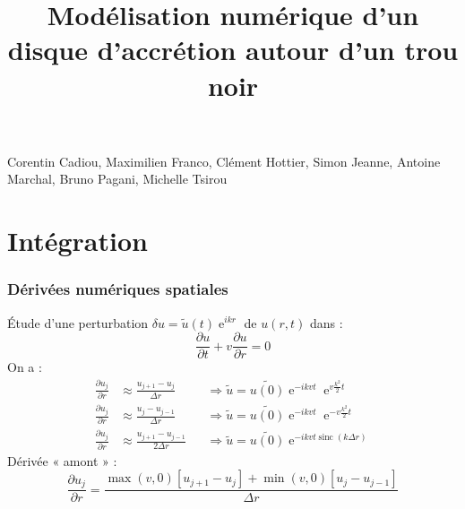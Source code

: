 \documentclass[french]{beamer}
\title{Modélisation numérique d'un disque d'accrétion autour d'un trou noir}
\date{}
\DeclareMathOperator{\sinc}{sinc}
\DeclareMathOperator{\e}{e}
\begin{document}
\begin{frame}
\maketitle
\begin{center}
Corentin Cadiou, Maximilien Franco, Clément Hottier, Simon Jeanne, Antoine Marchal, Bruno Pagani, Michelle Tsirou
\end{center}

\end{frame}













\section{Intégration}

\begin{frame}
    \frametitle{Dérivées numériques spatiales}
    Étude d’une perturbation $\delta{u} = \tilde{u}(t) \e^{ikr}$ de $u(r,t)$ dans :
    \begin{equation*}
        \frac{\partial u}{\partial t} + v \frac{\partial u}{\partial r} = 0
    \end{equation*}
    On a :
    \begin{align*}
        \frac{\partial u_j}{\partial r} &\approx \frac{u_{j+1} - u_j    }{  \Delta{r}} &&\Rightarrow \tilde{u} = \tilde{u(0)} \e^{-i k v t} \e^{ v\frac{k^2}{2}t}\\
        \frac{\partial u_j}{\partial r} &\approx \frac{u_j     - u_{j-1}}{  \Delta{r}} &&\Rightarrow \tilde{u} = \tilde{u(0)} \e^{-i k v t} \e^{-v\frac{k^2}{2}t}\\
        \frac{\partial u_j}{\partial r} &\approx \frac{u_{j+1} - u_{j-1}}{2 \Delta{r}} &&\Rightarrow \tilde{u} = \tilde{u(0)} \e^{-i k v t \sinc(k \Delta{r})}
    \end{align*}
    Dérivée « amont » :
    \begin{equation*}
        \frac{\partial u_j}{\partial r} = \frac{\max(v,0) \left[u_{j+1} - u_j \right] + \min(v,0) \left[u_j - u_{j-1}\right]}{\Delta{r}}
    \end{equation*}
\end{frame}
\end{document}
